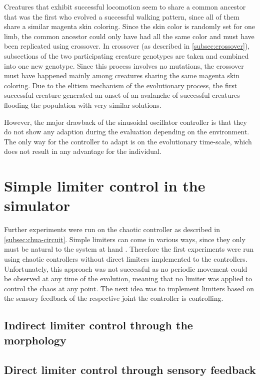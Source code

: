 \documentclass[main]{subfiles}
\begin{document}
Creatures that exhibit successful locomotion seem to share a common ancestor that was the first who evolved a successful walking pattern, since all of them share a similar magenta skin coloring. Since the skin color is randomly set for one limb, the common ancestor could only have had all the same color and must have been replicated using crossover. In crossover (as described in \ref{subsec:crossover}), subsections of the two participating creature genotypes are taken and combined into one new genotype. Since this process involves no mutations, the crossover must have happened mainly among creatures sharing the same magenta skin coloring. Due to the elitism mechanism of the evolutionary process, the first successful creature generated an onset of an avalanche of successful creatures flooding the population with very similar solutions. 

However, the major drawback of the sinusoidal oscillator controller is that they do not show any adaption during the evaluation depending on the environment. The only way for the controller to adapt is on the evolutionary time-scale, which does not result in any advantage for the individual.
\section{Simple limiter control in the simulator}

Further experiments were run on the chaotic controller as described in \ref{subsec:chua-circuit}. Simple limiters can come in various ways, since they only must be natural to the system at hand \cite{bib:Corron2000}. Therefore the first experiments were run using chaotic controllers without direct limiters implemented to the controllers. Unfortunately, this approach was not successful as no periodic movement could be observed at any time of the evolution, meaning that no limiter was applied to control the chaos at any point. The next idea was to implement limiters based on the sensory feedback of the respective joint the controller is controlling. 

\subsection{Indirect limiter control through the morphology}




\subsection{Direct limiter control through sensory feedback}
\end{document}
